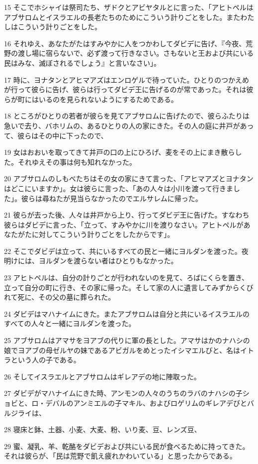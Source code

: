 \par 15 そこでホシャイは祭司たち、ザドクとアビヤタルとに言った、「アヒトペルはアブサロムとイスラエルの長老たちのためにこういう計りごとをした。またわたしはこういう計りごとをした。
\par 16 それゆえ、あなたがたはすみやかに人をつかわしてダビデに告げ、『今夜、荒野の渡し場に宿らないで、必ず渡って行きなさい。さもないと王および共にいる民はみな、滅ぼされるでしょう』と言いなさい」。
\par 17 時に、ヨナタンとアヒマアズはエンロゲルで待っていた。ひとりのつかえめが行って彼らに告げ、彼らは行ってダビデ王に告げるのが常であった。それは彼らが町にはいるのを見られないようにするためである。
\par 18 ところがひとりの若者が彼らを見てアブサロムに告げたので、彼らふたりは急いで去り、バホリムの、あるひとりの人の家にきた。その人の庭に井戸があって、彼らはその中に下ったので、
\par 19 女はおおいを取ってきて井戸の口の上にひろげ、麦をその上にまき散らした。それゆえその事は何も知れなかった。
\par 20 アブサロムのしもべたちはその女の家にきて言った、「アヒマアズとヨナタンはどこにいますか」。女は彼らに言った、「あの人々は小川を渡って行きました」。彼らは尋ねたが見当らなかったのでエルサレムに帰った。
\par 21 彼らが去った後、人々は井戸から上り、行ってダビデ王に告げた。すなわち彼らはダビデに言った、「立って、すみやかに川を渡りなさい。アヒトペルがあなたがたに対してこういう計りごとをしたからです」。
\par 22 そこでダビデは立って、共にいるすべての民と一緒にヨルダンを渡った。夜明けには、ヨルダンを渡らない者はひとりもなかった。
\par 23 アヒトペルは、自分の計りごとが行われないのを見て、ろばにくらを置き、立って自分の町に行き、その家に帰った。そして家の人に遺言してみずからくびれて死に、その父の墓に葬られた。
\par 24 ダビデはマハナイムにきた。またアブサロムは自分と共にいるイスラエルのすべての人々と一緒にヨルダンを渡った。
\par 25 アブサロムはアマサをヨアブの代りに軍の長とした。アマサはかのナハシの娘でヨアブの母ゼルヤの妹であるアビガルをめとったイシマエルびと、名はイトラという人の子である。
\par 26 そしてイスラエルとアブサロムはギレアデの地に陣取った。
\par 27 ダビデがマハナイムにきた時、アンモンの人々のうちのラバのナハシの子ショビと、ロ・デバルのアンミエルの子マキル、およびロゲリムのギレアデびとバルジライは、
\par 28 寝床と鉢、土器、小麦、大麦、粉、いり麦、豆、レンズ豆、
\par 29 蜜、凝乳、羊、乾酪をダビデおよび共にいる民が食べるために持ってきた。それは彼らが、「民は荒野で飢え疲れかわいている」と思ったからである。

